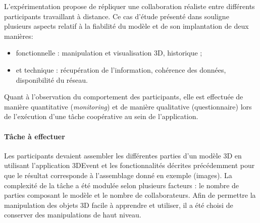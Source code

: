 L'expérimentation propose de répliquer une collaboration réaliste entre différents 
participants travaillant à distance. Ce cas d'étude présenté dans 
\cite{Desprat2017} souligne plusieurs aspects relatif à la fiabilité du modèle et de 
son implantation de deux manières: 
\begin{itemize}
	\item fonctionnelle : manipulation et visualisation 
	3D, historique ;
	\item et technique : récupération de l'information, cohérence des 
	données, disponibilité du réseau.
\end{itemize}

Quant à l'observation du comportement des participants, elle est 
effectuée de manière quantitative (\textit{monitoring}) et de manière qualitative 
(questionnaire) lors de l'exécution d'une tâche coopérative au sein de l'application.

\paragraph{Tâche à effectuer}
Les participants devaient assembler les différentes parties d'un modèle 3D en 
utilisant l'application 3DEvent et les fonctionnalités décrites précédemment 
 pour que le résultat corresponde à l'assemblage 
donné en exemple (images). La complexité de la tâche a été modulée selon 
plusieurs facteurs : le nombre de parties composant le modèle et le nombre de 
collaborateurs. Afin de permettre la manipulation des objets 3D facile à 
apprendre et utiliser, il a été choisi de conserver des manipulations de haut niveau.
